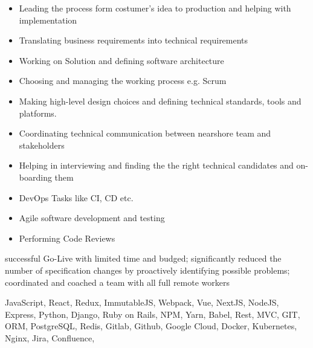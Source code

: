 \documentclass[9pt,a4paper]{altacv}
\begin{document}
%
\makebox[0pt][l]{%
  \hspace{-4cm}
  \raisebox{-\totalheight}[0pt][0pt]{%
   {\color{background}\fontsize{250}{48}\faRocket}
}}%
%

\begin{itemize}
\item Leading the process form costumer's idea to production and helping with implementation
\item Translating business requirements into technical requirements
\item Working on Solution and defining software architecture
\item Choosing and managing the working process e.g. Scrum
\item Making high-level design choices and defining technical standards, tools and platforms.
\item Coordinating technical communication between nearshore team and stakeholders
\item Helping in interviewing and finding the the right technical candidates and on-boarding them
\item DevOps Tasks like CI, CD etc.
\item Agile software development and testing
\item Performing Code Reviews
\end{itemize}

successful Go-Live with limited time and budged;
significantly reduced the number of specification changes by proactively identifying possible problems;
coordinated and coached a team with all full remote workers

JavaScript, React, Redux, ImmutableJS, Webpack, Vue, NextJS, NodeJS, Express,
Python, Django, Ruby on Rails, NPM, Yarn, Babel,
Rest, MVC, GIT, ORM, PostgreSQL, Redis,
Gitlab, Github, Google Cloud, Docker, Kubernetes, Nginx,
Jira, Confluence,

\divider


%
\end{document}
